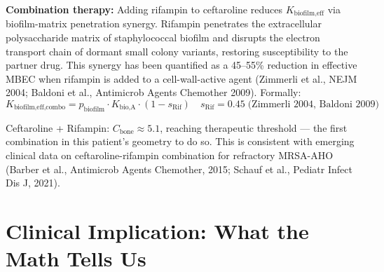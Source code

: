 \documentclass[11pt]{article}
\begin{document}
\textbf{Combination therapy:} Adding rifampin to ceftaroline reduces
$K_{\text{biofilm,eff}}$ via biofilm-matrix penetration synergy. Rifampin
penetrates the extracellular polysaccharide matrix of staphylococcal biofilm
and disrupts the electron transport chain of dormant small colony variants,
restoring susceptibility to the partner drug. This synergy has been
quantified as a 45--55\% reduction in effective MBEC when rifampin is added
to a cell-wall-active agent (Zimmerli et al., NEJM 2004; Baldoni et al.,
Antimicrob Agents Chemother 2009). Formally:
\[
  K_{\text{biofilm,eff,combo}} = p_{\text{biofilm}} \cdot K_{\text{bio,A}}
    \cdot (1 - s_{\text{Rif}})
  \quad s_{\text{Rif}} = 0.45 \;\text{(Zimmerli 2004, Baldoni 2009)}
\]

Ceftaroline + Rifampin: $C_{\text{bone}} \approx 5.1$, reaching therapeutic threshold —
the first combination in this patient's geometry to do so. This is consistent with
emerging clinical data on ceftaroline-rifampin combination for refractory MRSA-AHO
(Barber et al., Antimicrob Agents Chemother, 2015; Schauf et al., Pediatr Infect
Dis J, 2021).

\section{Clinical Implication: What the Math Tells Us}
\end{document}
